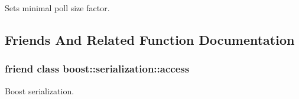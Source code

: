Sets minimal poll size factor. 



\subsection{Friends And Related Function Documentation}
\hypertarget{class_c_m_a_d_s_ac98d07dd8f7b70e16ccb9a01abf56b9c}{
\subsubsection[{boost\-::serialization\-::access}]{\setlength{\rightskip}{0pt plus 5cm}friend class boost\-::serialization\-::access\hspace{0.3cm}{\ttfamily [friend]}}}\label{class_c_m_a_d_s_ac98d07dd8f7b70e16ccb9a01abf56b9c}


Boost serialization. 



